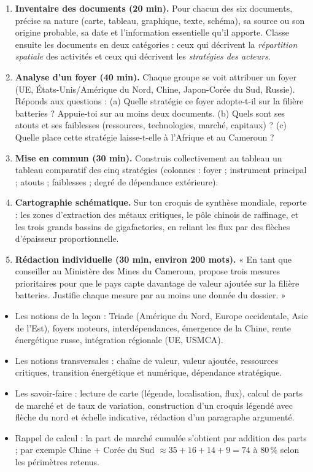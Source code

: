 \documentclass[11pt]{article}
\newcommand{\cle}[1]{{\popxbold\color{popdark}#1}}
\newcounter{popsec}
\newcounter{popsub}
\newcommand{\courssub}[1]{%
  \stepcounter{popsub}%
  \par\vspace{9pt}\noindent{\popxbold\fontsize{11.5}{13}\selectfont\color{popink}{\color{poporange}\thepopsec.\thepopsub}\hspace{6pt}#1}\par\nopagebreak\vspace{4pt}
}
\begin{document}
\begin{enumerate}
\item \textbf{Inventaire des documents (20 min).} Pour chacun des six documents, précise sa nature (carte, tableau, graphique, texte, schéma), sa source ou son origine probable, sa date et l'information essentielle qu'il apporte. Classe ensuite les documents en deux catégories : ceux qui décrivent la \emph{répartition spatiale} des activités et ceux qui décrivent les \emph{stratégies des acteurs}.
\item \textbf{Analyse d'un foyer (40 min).} Chaque groupe se voit attribuer un foyer (UE, États-Unis/Amérique du Nord, Chine, Japon-Corée du Sud, Russie). Réponds aux questions : (a) Quelle stratégie ce foyer adopte-t-il sur la filière batteries ? Appuie-toi sur au moins deux documents. (b) Quels sont ses atouts et ses faiblesses (ressources, technologies, marché, capitaux) ? (c) Quelle place cette stratégie laisse-t-elle à l'Afrique et au Cameroun ?
\item \textbf{Mise en commun (30 min).} Construis collectivement au tableau un tableau comparatif des cinq stratégies (colonnes : foyer ; instrument principal ; atouts ; faiblesses ; degré de dépendance extérieure).
\item \textbf{Cartographie schématique.} Sur ton croquis de synthèse mondiale, reporte : les zones d'extraction des métaux critiques, le pôle chinois de raffinage, et les trois grands bassins de gigafactories, en reliant les flux par des flèches d'épaisseur proportionnelle.
\item \textbf{Rédaction individuelle (30 min, environ 200 mots).} « En tant que conseiller au Ministère des Mines du Cameroun, propose trois mesures prioritaires pour que le pays capte davantage de valeur ajoutée sur la filière batteries. Justifie chaque mesure par au moins une donnée du dossier. »
\end{enumerate}

\courssub{Ressources à mobiliser}

\begin{itemize}
\item Les notions de la leçon : \cle{Triade} (Amérique du Nord, Europe occidentale, Asie de l'Est), foyers moteurs, interdépendances, émergence de la Chine, rente énergétique russe, intégration régionale (UE, USMCA).
\item Les notions transversales : \cle{chaîne de valeur}, \cle{valeur ajoutée}, \cle{ressources critiques}, transition énergétique et numérique, dépendance stratégique.
\item Les savoir-faire : lecture de carte (légende, localisation, flux), calcul de parts de marché et de taux de variation, construction d'un croquis légendé avec flèche du nord et échelle indicative, rédaction d'un paragraphe argumenté.
\item Rappel de calcul : la part de marché cumulée s'obtient par addition des parts ; par exemple Chine + Corée du Sud $\approx 35 + 16 + 14 + 9 = 74$ à $80\,\%$ selon les périmètres retenus.
\end{itemize}
\end{document}
